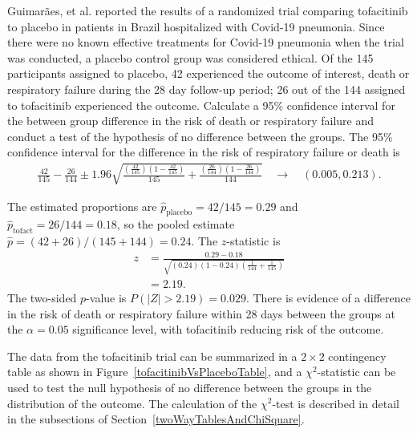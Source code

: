 \begin{examplewrap}
  \begin{nexample}{Guimar\~{a}es, et al.  reported the results of a randomized trial comparing tofacitinib to placebo in patients in Brazil hospitalized with Covid-19 pneumonia.  Since there were no known effective treatments for Covid-19 pneumonia when the trial was conducted, a placebo control group was considered ethical.  Of the 145 participants assigned to placebo, 42 experienced the outcome of interest, death or respiratory failure during the 28 day follow-up period; 26 out of the 144 assigned to tofacitinib experienced the outcome. Calculate a 95\% confidence interval for the between group difference in the risk of death or respiratory failure and conduct a test of the hypothesis of no difference between the groups.}
\label{tofacitinibVsPlacebo}
The 95\% confidence interval for the difference in the risk of respiratory failure or death is 
\begin{align*}
   \frac{42}{145} - \frac{26}{144} \pm 1.96  \sqrt{\frac{(\frac{42}{145})(1 - \frac{42}{145})}{145} 
   + \frac{(\frac{26}{144})(1 - \frac{26}{144})}{144}} \quad \to \quad (0.005, 0.213).
\end{align*}

The estimated proportions are $\hat{p}_{\text{placebo}} = 42/145 = 0.29$ and $\hat{p}_{\text{tofact}} = 26/144 = 0.18$, so the pooled estimate $\hat{p} = (42 + 26)/(145 + 144) = 0.24$.  The $z$-statistic is
\begin{align*}
  z &= \frac{0.29 - 0.18}{\sqrt{(0.24)(1-0.24)\left(\frac{1}{144} + \frac{1}{145} \right)}} \\
    &= 2.19.
\end{align*}
The two-sided $p$-value is $P(|Z| > 2.19) = 0.029$. There is evidence of a difference in the risk of death or respiratory failure within 28 days between the groups at the $\alpha = 0.05$ significance level, with tofacitinib reducing risk of the outcome.
  \end{nexample}
\end{examplewrap}

The data from the tofacitinib trial can be summarized in a $2 \times 2$ contingency table as shown in Figure~\ref{tofacitinibVsPlaceboTable}, and a $\chi^2$-statistic can be used to test the null hypothesis of no difference between the groups in the distribution of the outcome.  The calculation of the $\chi^2$-test is described in detail in the subsections of Section~\ref{twoWayTablesAndChiSquare}.

